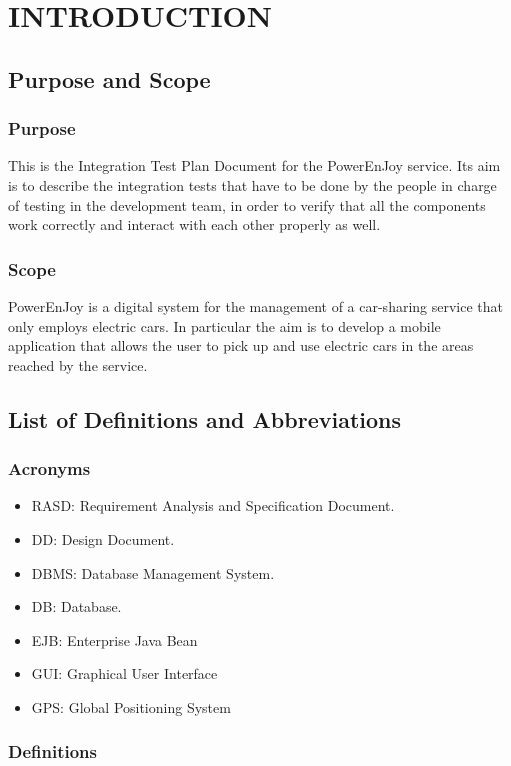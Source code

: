 \section{INTRODUCTION}
\subsection{Purpose and Scope}
\subsubsection{Purpose}

This is the Integration Test Plan Document for the PowerEnJoy service. Its aim is to describe the integration tests that have to be done by the people in charge of testing in the development team, in order to verify that all the components work correctly and interact with each other properly as well.
 
\subsubsection{Scope}
PowerEnJoy is a digital system for the management of a car-sharing service that only employs electric cars. In particular the aim is to develop a mobile application that allows the user to pick up and use electric cars in the areas reached by the service.

\subsection{List of Definitions and Abbreviations} 
\subsubsection{Acronyms}
\begin{itemize}
\item RASD: Requirement Analysis and Specification Document.
\item DD: Design Document.
\item DBMS: Database Management System.
\item DB: Database.
\item EJB: Enterprise Java Bean
\item GUI: Graphical User Interface
\item GPS: Global Positioning System

\end{itemize}
\subsubsection{Definitions}

